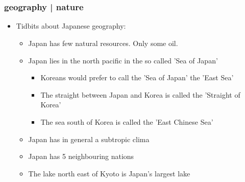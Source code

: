 \documentclass{article}
\newcommand\tabni[1][0.2cm]{\hspace*{#1}}
\begin{document}

\tableofcontents
\newpage

\part{}
\section{ \tabni geography |  \tabni nature}
\begin{itemize}
\item Tidbits about Japanese geography:
\begin{itemize}
\item Japan has few natural resources. Only some oil.
\item Japan lies in the north pacific in the so called 'Sea of Japan'
\begin{itemize}
\item Koreans would prefer to call the 'Sea of Japan' the 'East Sea'
\item The straight between Japan and Korea is called the 'Straight of Korea'
\item The sea south of Korea is called the 'East Chinese Sea'
\end{itemize}
\item Japan has in general a subtropic clima
\item Japan has 5 neighbouring nations
\item The lake  north east of Kyoto is Japan's largest lake
\end{itemize}
\end{itemize}
\end{document}
